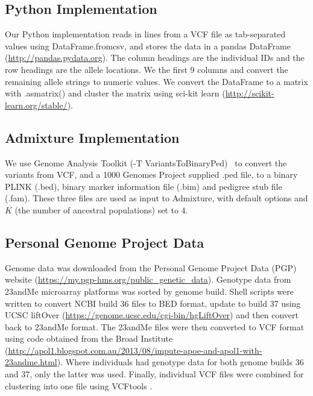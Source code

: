 \documentclass{bmcart}
\begin{document}
\subsection*{Python Implementation}
Our Python implementation reads in lines from a VCF file as tab-separated values using {\sc DataFrame.from\textunderscore{}csv}, and stores the data in a pandas DataFrame (\url{http://pandas.pydata.org}). The column headings are the individual IDs and the row headings are the allele locations.
We the first 9 columns and convert the remaining allele strings to numeric values.
We convert the DataFrame to a matrix with {\sc .as\textunderscore{}matrix()} and cluster the matrix using sci-kit learn (\url{http://scikit-learn.org/stable/}).

\subsection*{{\sc Admixture} Implementation}
We use Genome Analysis Toolkit ({\sc -T VariantsToBinaryPed})~\cite{McKenna2010} to convert the variants from VCF, and a 1000 Genomes Project supplied .ped file, to a binary PLINK (.bed), binary marker information file (.bim) and pedigree stub file (.fam).
These three files are used as input to {\sc Admixture}, with default options and $K$ (the number of ancestral populations) set to 4.

\subsection*{Personal Genome Project Data}
Genome data was downloaded from the Personal Genome Project Data (PGP) website (\url{https://my.pgp-hms.org/public_genetic_data}). Genotype data from 23andMe microarray platforms was sorted by genome 
build. Shell scripts were written to convert NCBI build 36 files to BED format, update to build 37 using UCSC liftOver (\url{https://genome.ucsc.edu/cgi-bin/hgLiftOver}) and 
then convert back to 23andMe format. The 23andMe files were then converted to VCF format using code obtained from the Broad Institute (\url{http://apol1.blogspot.com.au/2013/08/impute-apoe-and-apol1-with-23andme.html}). 
Where individuals had genotype data for both genome builds 36 and 37, only the latter was used. Finally, individual VCF files were combined for clustering into one 
file using VCFtools \cite{Danecek2011Variant}.


\end{document}
